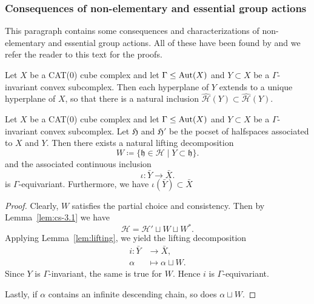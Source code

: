\subsubsection*{Consequences of non-elementary and essential group actions}
\label{cons-non-el-ess}

This paragraph contains some consequences and characterizations of non-elementary and essential group actions. All of these have been found by \textcite{Caprace2010} and we refer the reader to this text for the proofs.

\begin{lemma}
  \label{lem:cs-3.1}
  Let \(X\) be a CAT(0) cube complex and let \(\Gamma \leq \operatorname{Aut}(X)\) and \(Y \subset X\) be a \(\Gamma\)-invariant convex subcomplex. Then each hyperplane of \(Y\) extends to a unique hyperplane of \(X\), so that there is a natural inclusion \(\mathcal{\hat H}(Y) \subset \mathcal{\hat H}(Y)\).
\end{lemma}

\begin{lemma}
  \label{lem:roller-bnd-embedding}
  Let \(X\) be a CAT(0) cube complex and let \(\Gamma \leq \operatorname{Aut}(X)\) and \(Y \subset X\) be a \(\Gamma\)-invariant convex subcomplex. Let \(\mathfrak{H}\) and \(\mathfrak{H}'\) be the pocset of halfspaces associated to \(X\) and \(Y\). Then there exists a natural lifting decomposition
  \[
    W \coloneqq \{\mathfrak{h} \in \mathcal{H} \mid Y \subset \mathfrak{h}\}.
  \]
  and the associated continuous inclusion 
  \[
    \iota\colon \bar Y \to \bar X.
  \]
  is \(\Gamma\)-equivariant. Furthermore, we have \(\iota(\bar Y) \subset \bar X\)
\end{lemma}

\begin{proof}
  Clearly, \(W\) satisfies the partial choice and consistency. Then by Lemma~\ref{lem:cs-3.1} we have
  \[
    \mathcal{H} = \mathcal{H}' \sqcup W \sqcup W^\ast.
  \]
  Applying Lemma~\ref{lem:lifting}, we yield the lifting decomposition
  \begin{align*}
    i\colon \bar Y & \to \bar X,\\
    \alpha & \mapsto \alpha \sqcup W.
  \end{align*}
  Since \(Y\) is \(\Gamma\)-invariant, the same is true for \(W\). Hence \(i\) is \(\Gamma\)-equivariant.

  Lastly, if \(\alpha\) contains an infinite descending chain, so does \(\alpha \sqcup W\).
\end{proof}

